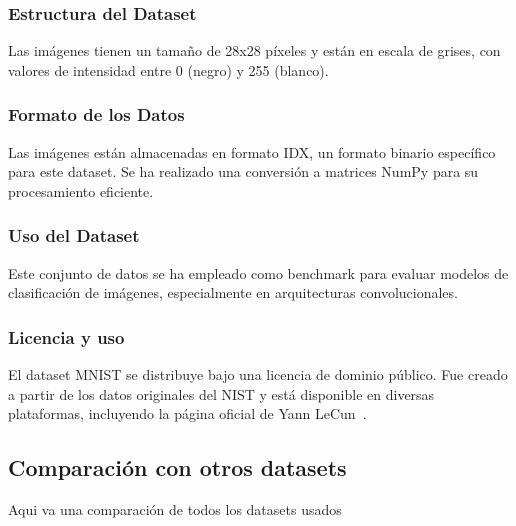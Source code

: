 \subsubsection{Estructura del Dataset}
Las imágenes tienen un tamaño de 28x28 píxeles y están en escala de grises, con valores de intensidad entre 0 (negro) y
255 (blanco).

\subsubsection{Formato de los Datos}
Las imágenes están almacenadas en formato IDX, un formato binario específico para este dataset.
Se ha realizado una conversión a matrices NumPy para su procesamiento eficiente.

\subsubsection{Uso del Dataset}
Este conjunto de datos se ha empleado como benchmark para evaluar modelos de clasificación de imágenes, especialmente
en arquitecturas convolucionales.

\subsubsection{Licencia y uso}
El dataset MNIST se distribuye bajo una licencia de dominio público.
Fue creado a partir de los datos originales del NIST y está disponible en diversas plataformas, incluyendo la página
oficial de Yann LeCun~\cite{lecun_yann_nodate}.


\subsection{Comparación con otros datasets}\label{subsec:comparacion-con-otros-datasets}
Aqui va una comparación de todos los datasets usados
